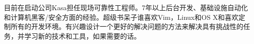 

\begin{cvparagraph}

目前在启动公司Kasa担任现场可靠性工程师。7年以上后台开发、基础设施自动化和计算机黑客/安全方面的经验。超级书呆子谁喜欢Vim，Linux和OS X和喜欢定制所有的开发环境。有兴趣设计一个更好的解决问题的方法来解决具有挑战性的任务，并学习新的技术和工具，如果需要的话。
\end{cvparagraph}
